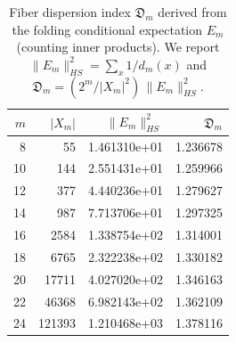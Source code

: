 \begin{table}[H]
\centering
\scriptsize
\setlength{\tabcolsep}{6pt}
\caption{Fiber dispersion index $\mathfrak{D}_m$ derived from the folding conditional expectation $E_m$ (counting inner products). We report $\|E_m\|_{HS}^2=\sum_x 1/d_m(x)$ and $\mathfrak{D}_m=(2^m/|X_m|^2)\,\|E_m\|_{HS}^2$.}
\label{tab:fold_fiber_dispersion_index}
\begin{tabular}{r r r r}
\toprule
$m$ & $|X_m|$ & $\|E_m\|_{HS}^2$ & $\mathfrak{D}_m$\\
\midrule
8 & 55 & 1.461310e+01 & 1.236678\\
10 & 144 & 2.551431e+01 & 1.259966\\
12 & 377 & 4.440236e+01 & 1.279627\\
14 & 987 & 7.713706e+01 & 1.297325\\
16 & 2584 & 1.338754e+02 & 1.314001\\
18 & 6765 & 2.322238e+02 & 1.330182\\
20 & 17711 & 4.027020e+02 & 1.346163\\
22 & 46368 & 6.982143e+02 & 1.362109\\
24 & 121393 & 1.210468e+03 & 1.378116\\
\bottomrule
\end{tabular}
\end{table}
